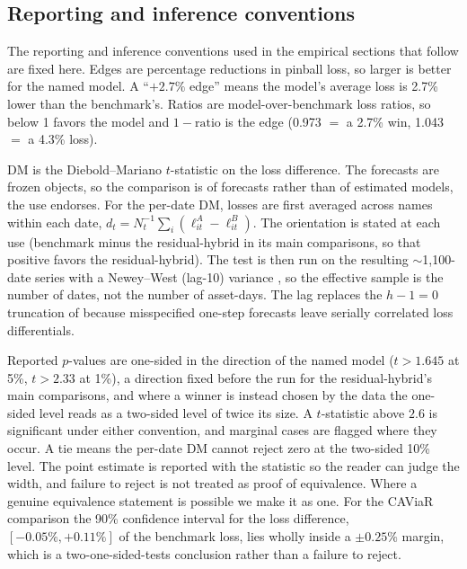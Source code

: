 \documentclass[11pt]{article}
\theoremstyle{remark}
\begin{document}
\subsection{Reporting and inference conventions}\label{sec:conventions}
The reporting and inference conventions used in the empirical sections that follow are fixed here. Edges are percentage
reductions in pinball loss, so larger is better for the named
model. A ``$+2.7\%$ edge'' means the model's average loss is 2.7\%
lower than the benchmark's. Ratios are model-over-benchmark
loss ratios, so below 1 favors the model and $1-\text{ratio}$ is
the edge (0.973 $=$ a 2.7\% win, 1.043 $=$ a 4.3\% loss).

DM is the Diebold--Mariano $t$-statistic on the loss
difference. The forecasts are frozen objects, so the comparison is of forecasts rather than of estimated models, the use \citet{diebold2015} endorses. For the per-date DM, losses are first averaged across names within each date, $d_t = N_t^{-1}\sum_i (\ell^{A}_{it} - \ell^{B}_{it})$. The orientation is stated at each use (benchmark minus the residual-hybrid in its main comparisons, so that positive favors the residual-hybrid). The test is then run on the resulting $\sim$1{,}100-date series with a Newey--West (lag-10) variance \citep{neweywest1987}, so the effective sample is the number of dates, not the number of asset-days. The lag replaces the $h-1=0$ truncation of \citet{dieboldmariano1995} because misspecified one-step forecasts leave serially correlated loss differentials.

Reported $p$-values are one-sided in
the direction of the named model ($t>1.645$ at 5\%, $t>2.33$ at 1\%), a direction fixed before the run for the residual-hybrid's main comparisons, and where a winner is instead chosen by the data the one-sided level reads as a two-sided level of twice its size.
A $t$-statistic above $2.6$ is significant under either convention, and
marginal cases are flagged where they occur. A tie means the
per-date DM cannot reject zero at the two-sided 10\% level. The point
estimate is reported with the statistic so the reader can judge the
width, and failure to reject is not treated as proof of equivalence.
Where a genuine equivalence statement is possible we make it as one. For the CAViaR comparison the 90\% confidence interval for the loss difference, $[-0.05\%,+0.11\%]$ of the benchmark loss, lies wholly inside a $\pm0.25\%$ margin, which is a two-one-sided-tests conclusion rather than a failure to reject.
\end{document}
